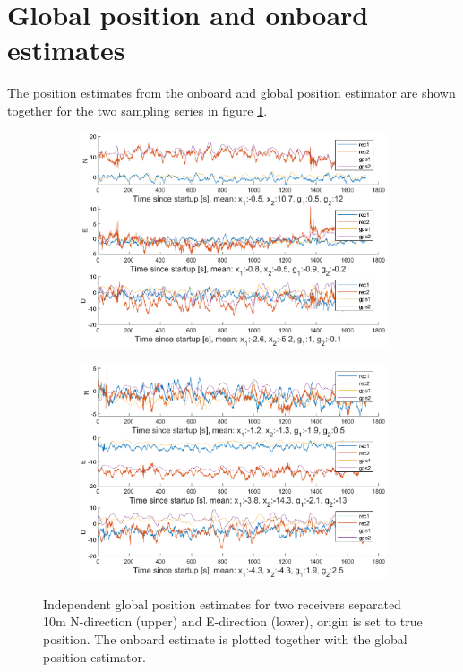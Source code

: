 \section{Global position and onboard estimates}
The position estimates from the onboard and global position estimator are shown together for the two sampling series in figure \ref{fig:onboardAndGlobal}.

\begin{figure}[H]
\begin{subfigure}{1.2\textwidth}
\includegraphics[width=1\textwidth]{Appendix/GlobalPosAndGPSNorth}
\end{subfigure}
\begin{subfigure}{1.2\textwidth}
\includegraphics[width=1\textwidth]{Appendix/GlobalPosAndGPSEast}
\end{subfigure}
\caption{\label{fig:onboardAndGlobal} Independent global position estimates for two receivers separated 10m N-direction (upper) and E-direction (lower), origin is set to true position. The onboard estimate is plotted together with the global position estimator.}
\end{figure}

